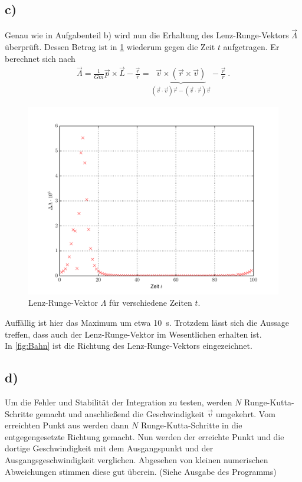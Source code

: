 \subsection*{c)}
Genau wie in Aufgabenteil b) wird nun die Erhaltung des Lenz-Runge-Vektors $\vec{\Lambda}$ überprüft.
Dessen Betrag ist in \cref{fig:LR} wiederum gegen die Zeit $t$ aufgetragen.
Er berechnet sich nach
\begin{align}
\vec{\Lambda}=\frac{1}{Gm}\vec{p}\times\vec{L}-\frac{\vec{r}}{r}
=\underbrace{\vec{v}\times\left(\vec{r}\times\vec{v}\right)}_{(\vec{v}\cdot\vec{v})\vec{r}-(\vec{v}\cdot\vec{r})\vec{v}}-\frac{\vec{r}}{r}~.
\end{align}
\begin{figure}[H]
	\centering
	\includegraphics[width = \textwidth]{../Plots/Plots_4_LR.pdf}
	\caption{Lenz-Runge-Vektor $\Lambda$ für verschiedene Zeiten $t$.\label{fig:LR}}
\end{figure}
Auffällig ist hier das Maximum um etwa \SI{10}{s}.
Trotzdem lässt sich die Aussage treffen, dass auch der Lenz-Runge-Vektor im Wesentlichen erhalten ist.\\
In \cref{fig:Bahn} ist die Richtung des Lenz-Runge-Vektors eingezeichnet.

\subsection*{d)}
Um die Fehler und Stabilität der Integration zu testen, werden $N$ Runge-Kutta-Schritte gemacht und anschließend die Geschwindigkeit $\vec{v}$ umgekehrt.
Vom erreichten Punkt aus werden dann $N$ Runge-Kutta-Schritte in die entgegengesetzte Richtung gemacht.
Nun werden der erreichte Punkt und die dortige Geschwindigkeit mit dem Ausgangspunkt und der Ausgangsgeschwindigkeit verglichen.
Abgesehen von kleinen numerischen Abweichungen stimmen diese gut überein.
(Siehe Ausgabe des Programms)

